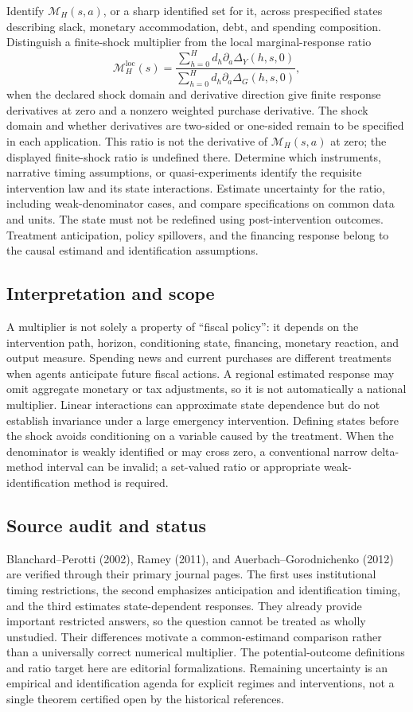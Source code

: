 \documentclass[11pt,a4paper]{article}
\begin{document}
Identify $\mathcal M_H(s,a)$, or a sharp identified set for it, across prespecified states describing slack, monetary accommodation, debt, and spending composition. Distinguish a finite-shock multiplier from the local marginal-response ratio
\[
\mathcal M_H^{\mathrm{loc}}(s)=
\frac{\sum_{h=0}^H d_h\partial_a\Delta_Y(h,s,0)}
{\sum_{h=0}^H d_h\partial_a\Delta_G(h,s,0)},
\]
when the declared shock domain and derivative direction give finite response derivatives at zero and a nonzero weighted purchase derivative. The shock domain and whether derivatives are two-sided or one-sided remain to be specified in each application. This ratio is not the derivative of $\mathcal M_H(s,a)$ at zero; the displayed finite-shock ratio is undefined there. Determine which instruments, narrative timing assumptions, or quasi-experiments identify the requisite intervention law and its state interactions. Estimate uncertainty for the ratio, including weak-denominator cases, and compare specifications on common data and units. The state must not be redefined using post-intervention outcomes. Treatment anticipation, policy spillovers, and the financing response belong to the causal estimand and identification assumptions.

\subsection*{Interpretation and scope}

A multiplier is not solely a property of ``fiscal policy'': it depends on the intervention path, horizon, conditioning state, financing, monetary reaction, and output measure. Spending news and current purchases are different treatments when agents anticipate future fiscal actions. A regional estimated response may omit aggregate monetary or tax adjustments, so it is not automatically a national multiplier. Linear interactions can approximate state dependence but do not establish invariance under a large emergency intervention. Defining states before the shock avoids conditioning on a variable caused by the treatment. When the denominator is weakly identified or may cross zero, a conventional narrow delta-method interval can be invalid; a set-valued ratio or appropriate weak-identification method is required.

\subsection*{Source audit and status}

Blanchard--Perotti (2002), Ramey (2011), and Auerbach--Gorodnichenko (2012) are verified through their primary journal pages. The first uses institutional timing restrictions, the second emphasizes anticipation and identification timing, and the third estimates state-dependent responses. They already provide important restricted answers, so the question cannot be treated as wholly unstudied. Their differences motivate a common-estimand comparison rather than a universally correct numerical multiplier. The potential-outcome definitions and ratio target here are editorial formalizations. Remaining uncertainty is an empirical and identification agenda for explicit regimes and interventions, not a single theorem certified open by the historical references.
\end{document}
